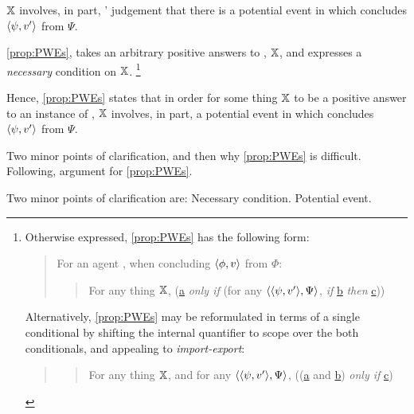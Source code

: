 \begin{note}
  {
    \color{red}
    \(\qzSaV{}\) involves, in part, \vAgent{}' judgement that there is a potential event in which \vAgent{} concludes \(\pv{\psi}{v'}\) from \(\Psi\).
  }

  \autoref{prop:PWEs}, takes an arbitrary positive answers to \qzS{}, \(\qzSaV{}\), and expresses a \emph{necessary} condition on \(\qzSaV{}\).%
  \footnote{
    Otherwise expressed, \autoref{prop:PWEs} has the following form:

    \begin{quote}
      For an agent \vAgent{}, when concluding \(\pv{\phi}{v}\) from \(\Phi\):
      \begin{quote}
        For any thing \(\qzSaV{}\), (\hyperref[prop:PWEs:a]{a} \emph{only if} (for any \(\pvp{\psi}{v'}{\Psi}\), \emph{if} \hyperref[prop:PWEs:b]{b} \emph{then} \hyperref[prop:PWEs:c]{c}))
      \end{quote}
    \end{quote}
    Alternatively, \autoref{prop:PWEs} may be reformulated in terms of a single conditional by shifting the internal quantifier to scope over the both conditionals, and appealing to \emph{import-export}:
    \begin{quote}
      \begin{quote}
        For any thing \(\qzSaV{}\), and for any \(\pvp{\psi}{v'}{\Psi}\), ((\hyperref[prop:PWEs:a]{a} and \hyperref[prop:PWEs:b]{b}) \emph{only if} \hyperref[prop:PWEs:c]{c})
      \end{quote}
    \end{quote}
  }

  Hence, \autoref{prop:PWEs} states that in order for some thing \(\qzSaV{}\) to be a positive answer to an instance of \qzS{}, \(\qzSaV{}\) involves, in part, a potential event in which \vAgent{} concludes \(\pv{\psi}{v'}\) from \(\Psi\).
\end{note}

\begin{note}
  Two minor points of clarification, and then why \autoref{prop:PWEs} is difficult.
  Following, argument for \autoref{prop:PWEs}.

  Two minor points of clarification are:
  Necessary condition.
  Potential event.
\end{note}


